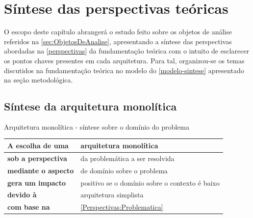 \chapter{Síntese das perspectivas teóricas}
\label{sinteses}

 O escopo deste capítulo abrangerá o estudo feito sobre os objetos de análise referidos na
 \autoref{sec:ObjetosDeAnalise}, apresentando a síntese das perspectivas abordadas na \autoref{perspectivas}
 da fundamentação teórica com o intuito de esclarecer os pontos chaves presentes em cada arquitetura.
 Para tal, organizou-se os temas discutidos na fundamentação teórica no modelo do \autoref{modelo-sintese} 
apresentado na seção metodológica.

\section{Síntese da arquitetura monolítica}
\label{monoSintese}

\begin{quadro}
    \caption{Arquitetura monolítica - síntese sobre o domínio do problema\label{monolitico:sintese-dominio}}
    \begin{tabularx}{\linewidth}{ | p{5cm} | X | }
    \hline
    \textbf{A escolha de uma}       & arquitetura monolítica \\ \hline
    \textbf{sob a perspectiva}      & da problemática a ser resolvida \\ \hline
    \textbf{mediante o aspecto}     & de domínio sobre o problema \\ \hline
    \textbf{gera um impacto}        & positivo se o domínio sobre o contexto é baixo\\ \hline
    \textbf{devido à }              & arquitetura simplista \\ \hline
    \textbf{com base na}            & \autoref{Perspectivas:Problematica} \\ \hline
    \end{tabularx}
\end{quadro}


